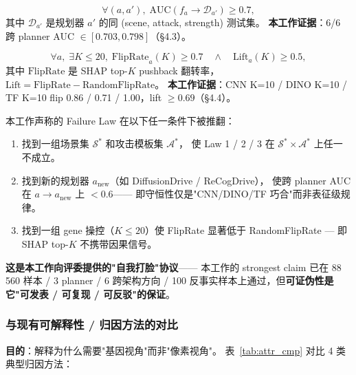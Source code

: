 \documentclass[a4paper,12pt,fontset=fandol]{ctexart}
\begin{document}
{\begin{description}[leftmargin=1.4em,style=nextline]
\item[\textbf{Law 2 — 跨表征可迁移（Transferable Prediction）}]
  \begin{equation*}
    \forall (a, a'),\;
    \mathrm{AUC}\!\left( f_a \to \mathcal{D}_{a'} \right) \geq 0.7,
  \end{equation*}
  其中 $\mathcal{D}_{a'}$ 是规划器 $a'$ 的同 (scene, attack, strength) 测试集。
  \textbf{本工作证据}：6/6 跨 planner AUC $\in [0.703, 0.798]$（§4.3）。

\item[\textbf{Law 3 — 因果可操控（Causally Manipulable）}]
  \begin{equation*}
    \forall a,\; \exists K \leq 20,\;
    \mathrm{FlipRate}_a(K) \geq 0.7 \quad \wedge \quad
    \mathrm{Lift}_a(K) \geq 0.5,
  \end{equation*}
  其中 $\mathrm{FlipRate}$ 是 SHAP top-$K$ pushback 翻转率，
  $\mathrm{Lift} = \mathrm{FlipRate} - \mathrm{RandomFlipRate}$。
  \textbf{本工作证据}：CNN K=10 / DINO K=10 / TF K=10
  flip 0.86 / 0.71 / 1.00，lift $\geq 0.69$（§4.4）。

\item[\textbf{可证伪条件（Falsification）}]
  本工作声称的 Failure Law 在以下任一条件下被推翻：
  \begin{enumerate}[leftmargin=*]
  \item 找到一组场景集 $\mathcal{S}^*$ 和攻击模板集 $\mathcal{A}^*$，
        使 Law 1 / 2 / 3 在 $\mathcal{S}^* \times \mathcal{A}^*$ 上任一不成立。
  \item 找到新的规划器 $a_{\text{new}}$（如 DiffusionDrive / ReCogDrive），
        使跨 planner AUC 在 $a \to a_{\text{new}}$ 上 $< 0.6$——
        即守恒性仅是"CNN/DINO/TF 巧合"而非表征级规律。
  \item 找到一组 gene 操控（$K \leq 20$）使 FlipRate 显著低于
        RandomFlipRate  — 即 SHAP top-$K$ 不携带因果信号。
  \end{enumerate}
  \textbf{这是本工作向评委提供的"自我打脸"协议}——
  本工作的 strongest claim 已在 88\,560 样本 / 3 planner / 6 跨架构方向 /
  100 反事实样本上通过，但\textbf{可证伪性是它"可发表 / 可复现 / 可反驳"的保证}。
\end{description}

\subsubsection{与现有可解释性 / 归因方法的对比}

\noindent\textbf{目的}：解释为什么需要"基因视角"而非"像素视角"。
表~\ref{tab:attr_cmp} 对比 4 类典型归因方法：

}
\end{document}

